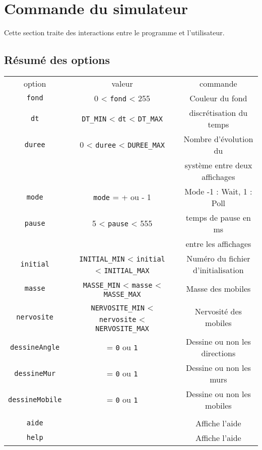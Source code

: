 \section{Commande du simulateur}
%
Cette section traite des interactions entre le programme et l'utilisateur.
%
\subsection{Résumé des options}
\begin{center}
\begin{tabular}{ccccc}
option & & valeur &  & commande \\
\texttt{fond} &  & 0 < \texttt{fond} < 255 &  & Couleur du fond \\
\texttt{dt} &  & \texttt{DT\_MIN} < \texttt{dt} < \texttt{DT\_MAX} &  & discrétisation du temps \\
\texttt{duree} &  & 0 < \texttt{duree} < \texttt{DUREE\_MAX} &  & Nombre d'évolution du \\
 &  &  &  & système entre deux affichages \\
\texttt{mode} &  & \texttt{mode} = + ou - 1 &  & Mode -1 : Wait, 1 : Poll \\
\texttt{pause} &  & 5 < \texttt{pause} < 555 &  & temps de pause en ms \\
 &  &  &  & entre les affichages \\
\texttt{initial} &  & \texttt{INITIAL\_MIN} < \texttt{initial} < \texttt{INITIAL\_MAX} &  & Numéro du fichier d'initialisation \\
\texttt{masse} &  & \texttt{MASSE\_MIN} < \texttt{masse} < \texttt{MASSE\_MAX} &  & Masse des mobiles \\
\texttt{nervosite} &  & \texttt{NERVOSITE\_MIN} < \texttt{nervosite} < \texttt{NERVOSITE\_MAX} &  & Nervosité des mobiles \\%
\texttt{dessineAngle} &  & = \texttt{0} ou \texttt{1} &  & Dessine ou non les directions \\
\texttt{dessineMur} &  & = \texttt{0} ou \texttt{1} &  & Dessine ou non les murs \\
\texttt{dessineMobile} &  & = \texttt{0} ou \texttt{1} &  & Dessine ou non les mobiles \\

\\
\texttt{aide} &  &  &  & Affiche l'aide \\
\texttt{help} &  &  &  & Affiche l'aide \\
\end{tabular}
\end{center}
%
